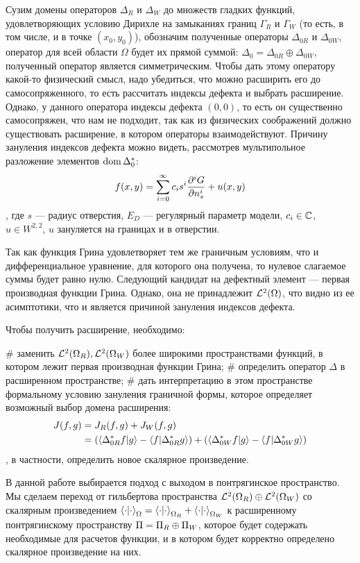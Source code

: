 Сузим домены операторов $\Delta_R$ и $\Delta_W$ до множеств гладких функций, удовлетворяющих условию Дирихле на замыканиях границ $\Gamma_R$ и $\Gamma_W$ (то есть, в том числе, и в точке $(x_0, y_0)$), обозначим полученные операторы $\Delta_{0R}$ и $\Delta_{0W}$, оператор для всей области $\Omega$ будет их прямой суммой: $\Delta_0 = \Delta_{0R} \oplus \Delta_{0W}$, полученный оператор является симметрическим. Чтобы дать этому оператору какой-то физический смысл, надо убедиться, что можно расширить его до самосопряженного, то есть рассчитать индексы дефекта и выбрать расширение. Однако, у данного оператора индексы дефекта $(0, 0)$, то есть он существенно самосопряжен, что нам не подходит, так как из физических соображений должно существовать расширение, в котором операторы взаимодействуют. Причину зануления индексов дефекта можно видеть, рассмотрев мультипольное разложение элементов $\operatorname{dom} \Delta_0^*$:
\[
f(x, y) = \sum\limits_{i = 0}^\infty c_i s^i \pdv[i]{G}{n_s} (x, y, x_0, y_0; E_D) + u(x, y)
\]
, где $s$ — радиус отверстия, $E_D$ — регулярный параметр модели, $c_i \in \mathbb{C}$, $u \in W^{2, 2}$, $u$ зануляется на границах и в отверстии.

Так как функция Грина удовлетворяет тем же граничным условиям, что и дифференциальное уравнение, для которого она получена, то нулевое слагаемое суммы будет равно нулю. Следующий кандидат на дефектный элемент — первая производная функции Грина. Однако, она не принадлежит $\mathcal{L}^2(\Omega)$, что видно из ее асимптотики, что и является причиной зануления индексов дефекта.

Чтобы получить расширение, необходимо:
\begin{ilist}
# заменить $\mathcal{L}^2(\Omega_R), \mathcal{L}^2(\Omega_W)$ более широкими пространствами функций, в котором лежит первая производная функции Грина;
# определить оператор $\Delta$ в расширенном пространстве;
# дать интерпретацию в этом пространстве формальному условию зануления граничной формы, которое определяет возможный выбор домена расширения:
\begin{align*}
J(f, g)
& = J_R(f, g) + J_W(f, g) \\
& = (\ip{\Delta_{0R}^* f}{g} - \ip{f}{\Delta_{0R}^* g}) + (\ip{\Delta_{0W}^* f}{g} - \ip{f}{\Delta_{0W}^* g})
\end{align*}
, в частности, определить новое скалярное произведение.
\end{ilist}
В данной работе выбирается подход с выходом в понтрягинское пространство. Мы сделаем переход от гильбертова пространства $\mathcal{L}^2(\Omega_R) \oplus \mathcal{L}^2(\Omega_W)$ со скалярным произведением $\ipcdot_\Omega = \ipcdot_{\Omega_R} + \ipcdot_{\Omega_W}$ к расширенному понтрягинскому пространству $\Pi = \Pi_R \oplus \Pi_W$, которое будет содержать необходимые для расчетов функции, и в котором будет корректно определено скалярное произведение на них.

